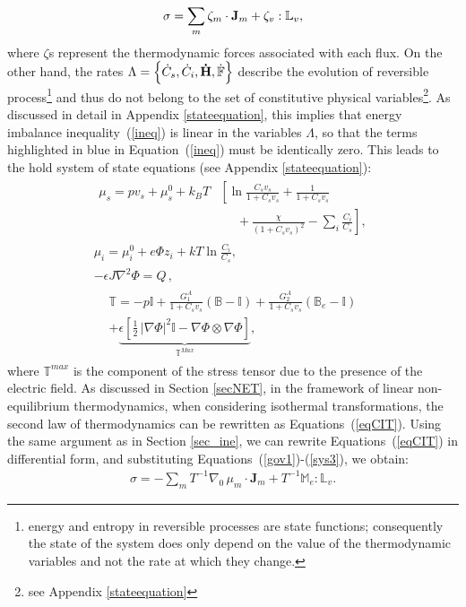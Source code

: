 \begin{equation}
\sigma = \sum_m \zeta_m \cdot \mathbf{J}_m + \zeta_v : \mathbb{L}_v,
\label{dis}
\end{equation}
where $\zeta$s represent the thermodynamic forces associated with each flux. On the other hand, the rates $\Lambda =\left\{\dot{C}_s,\dot{C}_i,\mathbf{\dot{H}},\dot{\mathbb{F}}\right\}$ describe the evolution of reversible process\footnote{energy and entropy in reversible processes are state functions; consequently the state of the system does only depend on the value of the thermodynamic variables and not the rate at which they change.} and thus do not belong to the set of constitutive physical variables\footnote{see Appendix \ref{stateequation}}. As discussed in detail in Appendix \ref{stateequation}, this implies that energy imbalance inequality~(\ref{ineq}) is linear in the variables $\Lambda$, so that the terms highlighted in blue in Equation~(\ref{ineq}) must be identically zero. This leads to the hold system of state equations (see Appendix \ref{stateequation}):
\begin{gather}
\begin{aligned}
\mu_s = p v_s + \mu_s^0 + k_BT&\left[\ln \frac{C_s v_s}{1+C_s v_s} + \frac{1}{1+C_sv_s}\right.\\
&\left.\ \ \ \ \ \ +\frac{\chi}{(1+C_s v_s)^2}-\sum_i \frac{C_i}{C_s}\right], 
\end{aligned}\label{gov1}\\[2.5mm]
\mu_i = \mu^0_i + e\Phi z_i + kT \ln \frac{C_i}{C_s},\label{mu}\\
-\epsilon J \nabla^2 \Phi = Q\, ,\label{sys2}
\end{gather}
\begin{gather}
\begin{aligned}
\mathbb{T}= -p \mathbb{I}+ \frac{G^A_1}{1+C_sv_s}\left(\mathbb{B}-\mathbb{I}\right) + \frac{G^A_2}{1+C_sv_s}\left(\mathbb{B}_e-\mathbb{I}\right) \\
+ \underbrace{\epsilon \left[\frac{1}{2} \,|\nabla \Phi|^2\mathbb{I} -\nabla \Phi \otimes \nabla \Phi\right]}_{\mathbb{T}^{Max}},
\end{aligned}
\label{sys3}
\end{gather}
where $\mathbb{T}^{max}$ is the component of the stress tensor due to the presence of the electric field. As discussed in Section \ref{secNET}, in the framework of linear non-equilibrium thermodynamics, when considering isothermal transformations, the second law of thermodynamics can be rewritten as Equations~(\ref{eqCIT}). Using the same argument as in Section \ref{sec_ine}, we can rewrite Equations~(\ref{eqCIT}) in differential form, and substituting Equations~(\ref{gov1})-(\ref{sys3}), we obtain:
\begin{equation}
\begin{aligned}
\sigma = -  \sum_m T^{-1} \nabla_0 \,\mu_m \cdot \mathbf{J}_m + T^{-1}\mathbb{M}_e:\mathbb{L}_v.\label{EQen}
\end{aligned} 
\end{equation}


